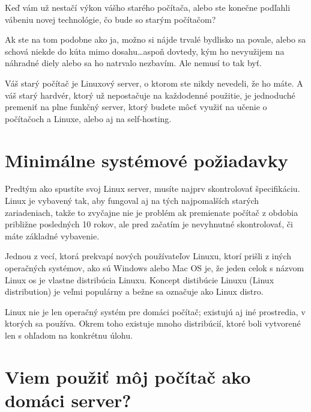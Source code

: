
Keď vám už nestačí výkon vášho starého počítača, alebo ste konečne podľahli vábeniu novej technológie, čo bude so starým počítačom?

Ak ste na tom podobne ako ja, možno si nájde trvalé bydlisko na povale, alebo sa schová niekde do kúta mimo dosahu\ldots aspoň dovtedy, kým ho nevyužijem na náhradné diely alebo sa ho natrvalo nezbavím. Ale nemusí to tak byť.

Váš starý počítač je Linuxový server, o ktorom ste nikdy nevedeli, že ho máte. A váš starý hardvér, ktorý už nepostačuje na každodenné použitie, je jednoduché premeniť na plne funkčný server, ktorý budete môcť využiť na učenie o počítačoch a Linuxe, alebo aj na self-hosting.

\section*{Minimálne systémové požiadavky}

Predtým ako spustíte svoj Linux server, musíte najprv skontrolovať špecifikáciu. Linux je vybavený tak, aby fungoval aj na tých najpomalších starých zariadeniach, takže to zvyčajne nie je problém ak premienate počítač z obdobia približne posledných 10 rokov, ale pred začatím je nevyhnutné skontrolovať, či máte základné vybavenie.

Jednou z vecí, ktorá prekvapí nových používateľov Linuxu, ktorí prišli z iných operačných systémov, ako sú Windows alebo Mac OS je, že jeden celok s názvom Linux os je vlastne distribúcia Linuxu. Koncept distibúcie Linuxu (Linux distribution) je veľmi populárny a bežne sa označuje ako Linux distro. \autocite[3]{castro_linux-distros_2016}

Linux nie je len operačný systém pre domáci počítač; existujú aj iné prostredia, v ktorých sa používa. Okrem toho existuje mnoho distribúcií, ktoré boli vytvorené len s ohľadom na konkrétnu úlohu.



\section*{Viem použiť môj počítač ako domáci server?}

